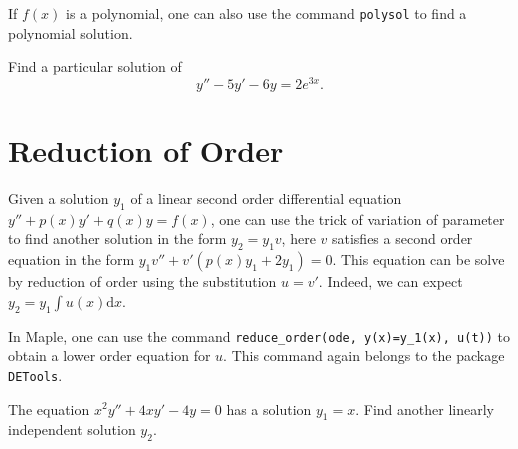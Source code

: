 \documentclass[
  12pt]{elegantbook}
\begin{document}
If \(f(x)\) is a polynomial, one can also use the command \texttt{polysol} to find a polynomial solution.

\begin{exercise}
Find a particular solution of
\[y''- 5y'- 6y=2e^{3x}.\]
\end{exercise}

\hypertarget{reduction-of-order}{%
\section{Reduction of Order}\label{reduction-of-order}}

Given a solution \(y_1\) of a linear second order differential equation \(y'' + p(x)y' + q(x)y=f(x)\), one can use the trick of variation of parameter to find another solution in the form \(y_2=y_1v\), here \(v\) satisfies a second order equation in the form \(y_1v'' + v'(p(x)y_1+2y_1)=0\). This equation can be solve by reduction of order using the substitution \(u=v'\). Indeed, we can expect \(y_2=y_1\int u(x)\mathrm{d}x\).

In Maple, one can use the command \texttt{reduce\_order(ode,\ y(x)=y\_1(x),\ u(t))} to obtain a lower order equation for \(u\). This command again belongs to the package \texttt{DETools}.

\begin{example}
The equation \(x^2y''+ 4xy'-4y=0\) has a solution \(y_1=x\). Find another linearly independent solution \(y_2\).
\end{example}
\end{document}

